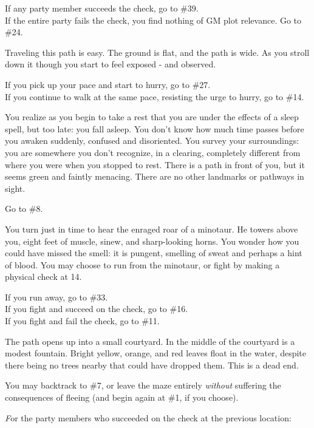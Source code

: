 \documentclass[green]{gl2018}
\begin{document}
\begin{large}
\begin{location}{34}
\begin{fromhere}
If any party member succeeds the check, go to \#39.\\
 If the entire party fails the check, you find nothing of GM plot relevance. Go to \#24.
\end{fromhere}
\end{location}
\begin{location}{35}
Traveling this path is easy. The ground is flat, and the path is wide. As you stroll down it though you start to feel exposed - and observed. 
\begin{fromhere}If you pick up your pace and start to hurry, go to \#27.\\
 If you continue to walk at the same pace, resisting the urge to hurry, go to \#14.
\end{fromhere}
\end{location}
\begin{location}{36}
You realize as you begin to take a rest that you are under the effects of a sleep spell, but too late: you fall asleep.  You don't know how much time passes before you awaken suddenly, confused and disoriented.  You survey your surroundings: you are somewhere you don't recognize, in a clearing, completely different from where you were when you stopped to rest.  There is a path in front of you, but it seems green and faintly menacing.  There are no other landmarks or pathways in sight.
\begin{fromhere}Go to \#8.\end{fromhere}
\end{location}
\begin{location}{37}
You turn just in time to hear the enraged roar of a minotaur.  He towers above you, eight feet of muscle, sinew, and sharp-looking horns.  You wonder how you could have missed the smell: it is pungent, smelling of sweat and perhaps a hint of blood.  You may choose to run from the minotaur, or fight by making a physical check at 14.
\begin{fromhere}
  If you run away, go to \#33.\\
If you fight and succeed on the check, go to \#16. \\
 If you fight and fail the check, go to \#11.
\end{fromhere}
\end{location}
\begin{location}{38}
The path opens up into a small courtyard. In the middle of the courtyard is a modest fountain.  Bright yellow, orange, and red leaves float in the water, despite there being no trees nearby that could have dropped them. This is a dead end.
\begin{fromhere} You may backtrack to \#7, or leave the maze entirely {\em without} suffering the consequences of fleeing (and begin again at \#1, if you choose).
\end{fromhere}
\end{location}
\begin{location}{39}
{\emph For the party members who succeeded on the check at the previous location:}


\end{location}
\end{large}
\end{document}
